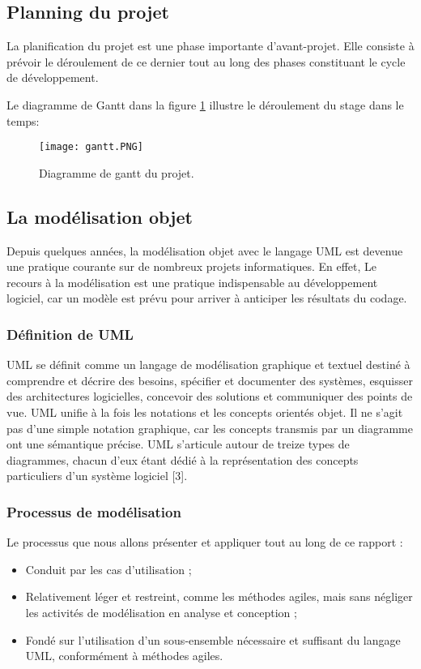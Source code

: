 \subsection{Planning du projet}

La planification du projet est une phase importante d’avant-projet. Elle consiste à prévoir le déroulement de ce dernier tout au long des phases constituant le cycle de développement.

\medskip

Le diagramme de Gantt dans la figure \ref{fig:gantt} illustre le déroulement du stage dans le temps:
\clearpage
%
\begin{figure}[ht]
  \centering
  \texttt{[image: gantt.PNG]}
  \caption{Diagramme de gantt du projet.}
  \label{fig:gantt}
\end{figure}
\FloatBarrier
\subsection{La modélisation objet}
Depuis quelques années, la modélisation objet avec le langage UML est devenue une pratique
courante sur de nombreux projets informatiques. En effet, Le recours à la modélisation est
une pratique indispensable au développement logiciel, car un modèle est prévu pour arriver à
anticiper les résultats du codage.
\subsubsection{Définition de UML}
UML se définit comme un langage de modélisation graphique et textuel destiné à comprendre et décrire des besoins, spécifier et documenter des systèmes, esquisser des architectures
logicielles, concevoir des solutions et communiquer des points de vue. UML unifie à la fois les
notations et les concepts orientés objet. Il ne s’agit pas d’une simple notation graphique, car
les concepts transmis par un diagramme ont une sémantique précise.
UML s’articule autour de treize types de diagrammes, chacun d’eux étant dédié à la représentation des concepts particuliers d’un système logiciel [3].


\subsubsection{Processus de modélisation}
Le processus que nous allons présenter et appliquer tout au long de ce rapport :

\begin{itemize}
	\item Conduit par les cas d’utilisation ;
	\item Relativement léger et restreint, comme les méthodes agiles, mais sans négliger les activités
	de modélisation en analyse et conception ;
	\item Fondé sur l’utilisation d’un sous-ensemble nécessaire et suffisant du langage UML, conformément à méthodes agiles.
\end{itemize}



